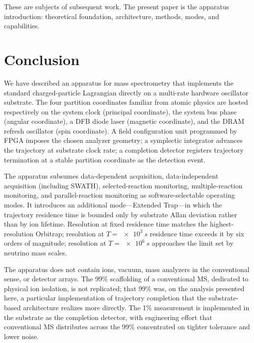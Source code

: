 \documentclass[twocolumn,11pt,a4paper]{article}
\theoremstyle{definition}
\theoremstyle{remark}
\begin{document}
These are subjects of subsequent work. The present paper is the apparatus introduction: theoretical foundation, architecture, methods, modes, and capabilities.

\section{Conclusion}
\label{sec:conclusion}

We have described an apparatus for mass spectrometry that implements the standard charged-particle Lagrangian directly on a multi-rate hardware oscillator substrate. The four partition coordinates familiar from atomic physics are hosted respectively on the system clock (principal coordinate), the system bus phase (angular coordinate), a DFB diode laser (magnetic coordinate), and the DRAM refresh oscillator (spin coordinate). A field configuration unit programmed by FPGA imposes the chosen analyzer geometry; a symplectic integrator advances the trajectory at substrate clock rate; a completion detector registers trajectory termination at a stable partition coordinate as the detection event.

The apparatus subsumes data-dependent acquisition, data-independent acquisition (including SWATH), selected-reaction monitoring, multiple-reaction monitoring, and parallel-reaction monitoring as software-selectable operating modes. It introduces an additional mode---Extended Trap---in which the trajectory residence time is bounded only by substrate Allan deviation rather than by ion lifetime. Resolution at fixed residence time matches the highest-resolution Orbitrap; resolution at $T = \SI{e3}{s}$ residence time exceeds it by six orders of magnitude; resolution at $T = \SI{e6}{s}$ approaches the limit set by neutrino mass scales.

The apparatus does not contain ions, vacuum, mass analyzers in the conventional sense, or detector arrays. The 99\% scaffolding of a conventional MS, dedicated to physical ion isolation, is not replicated; that 99\% was, on the analysis presented here, a particular implementation of trajectory completion that the substrate-based architecture realizes more directly. The 1\% measurement is implemented in the substrate as the completion detector, with engineering effort that conventional MS distributes across the 99\% concentrated on tighter tolerance and lower noise.
\end{document}
